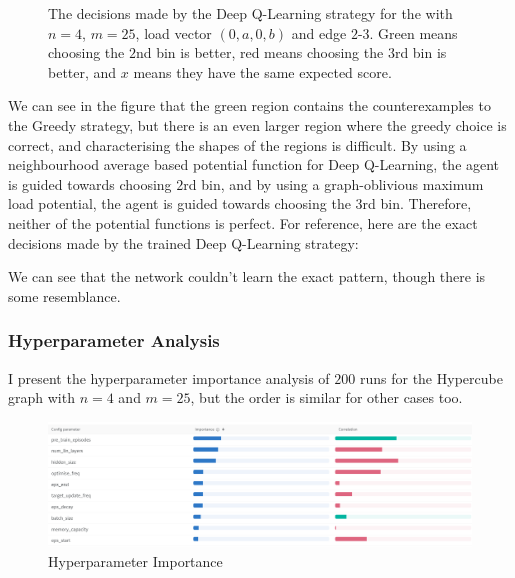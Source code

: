 \begin{figure}
\begin{minipage}[t]{.48\linewidth}
  \caption{The decisions made by the Deep Q-Learning strategy for the \CycleGraph with $n=4$, $m=25$, load vector $(0,a,0,b)$ and edge $2$-$3$. Green means choosing the $2$nd bin is better, red means choosing the $3$rd bin is better, and $x$ means they have the same expected score.}
  \label{greedy-counterexample-analysed-for-dqn}
\end{minipage}
\end{figure}



We can see in the figure that the green region contains the counterexamples to the Greedy strategy, but there is an even larger region where the greedy choice is correct, and characterising the shapes of the regions is difficult. By using a neighbourhood average based potential function for Deep Q-Learning, the agent is guided towards choosing $2$rd bin, and by using a graph-oblivious maximum load potential, the agent is guided towards choosing the $3$rd bin. Therefore, neither of the potential functions is perfect. For reference, here are the exact decisions made by the trained Deep Q-Learning strategy: 



We can see that the network couldn't learn the exact pattern, though there is some resemblance.


\subsubsection{Hyperparameter Analysis}

I present the hyperparameter importance analysis of $200$ runs for the Hypercube graph with $n=4$ and $m=25$, but the order is similar for other cases too.

\begin{figure}[h] \label{graphical-two-choice-hyperparameter-importance}
    \centering
    \includegraphics[scale=0.4]{Chapter4/Figs/graphical_two_choice_hypercube_4_25_importance.png}
    \caption{\GraphicalTwoChoice Hyperparameter Importance \cite{biewald2020wandb}}
\end{figure}


